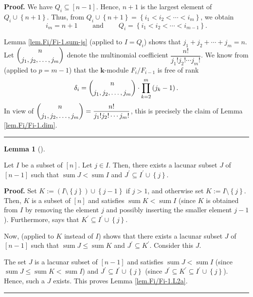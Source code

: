 \documentclass[numbers=enddot,12pt,final,onecolumn,notitlepage]{scrartcl}%
\theoremstyle{definition}
\newtheorem{lem}[theo]{Lemma}
\newenvironment{lemma}[1][]
{\begin{lem}[#1]\begin{leftbar}}
{\end{leftbar}\end{lem}}
\newenvironment{proof}[1][Proof]{\noindent\textbf{#1.} }{\ \rule{0.5em}{0.5em}}
\let\prodnonlimits\prod
\renewcommand{\prod}{\prodnonlimits\limits}
\begin{document}
\begin{proof}
We have $Q_{i}\subseteq\left[  n-1\right]  $. Hence, $n+1$ is the largest
element of $Q_{i}\cup\left\{  n+1\right\}  $. Thus, from $Q_{i}\cup\left\{
n+1\right\}  =\left\{  i_{1}<i_{2}<\cdots<i_{m}\right\}  $, we obtain
\[
i_{m}=n+1\ \ \ \ \ \ \ \ \ \ \text{and}\ \ \ \ \ \ \ \ \ \ Q_{i}=\left\{
i_{1}<i_{2}<\cdots<i_{m-1}\right\}  .
\]


Lemma \ref{lem.Fi/Fi-1.sum-js} (applied to $I=Q_{i}$) shows that $j_{1}%
+j_{2}+\cdots+j_{m}=n$. Let $\dbinom{n}{j_{1},j_{2},\ldots,j_{m}}$ denote the
multinomial coefficient $\dfrac{n!}{j_{1}!j_{2}!\cdots j_{m}!}$. We know from
\cite[Theorem 13.1 \textbf{(a)} and \textbf{(c)}]{s2b1} (applied to $p=m-1$)
that the $\mathbf{k}$-module $F_{i}/F_{i-1}$ is free of rank%
\[
\delta_{i}=\dbinom{n}{j_{1},j_{2},\ldots,j_{m}}\cdot\prod_{k=2}^{m}\left(
j_{k}-1\right)  .
\]
In view of $\dbinom{n}{j_{1},j_{2},\ldots,j_{m}}=\dfrac{n!}{j_{1}!j_{2}!\cdots
j_{m}!}$, this is precisely the claim of Lemma \ref{lem.Fi/Fi-1.dim}.
\end{proof}

\begin{lemma}
\label{lem.Fi/Fi-1.L2a}Let $I$ be a subset of $\left[  n\right]  $. Let $j\in
I$. Then, there exists a lacunar subset $J$ of $\left[  n-1\right]  $ such
that $\operatorname*{sum}J<\operatorname*{sum}I$ and $J^{\prime}\subseteq
I^{\prime}\cup\left\{  j\right\}  $.
\end{lemma}

\begin{proof}
Set $K:=\left(  I\setminus\left\{  j\right\}  \right)  \cup\left\{
j-1\right\}  $ if $j>1$, and otherwise set $K:=I\setminus\left\{  j\right\}
$. Then, $K$ is a subset of $\left[  n\right]  $ and satisfies
$\operatorname*{sum}K<\operatorname*{sum}I$ (since $K$ is obtained from $I$ by
removing the element $j$ and possibly inserting the smaller element $j-1$).
Furthermore, \cite[Proposition 8.6 \textbf{(a)}]{s2b1} says that $K^{\prime
}\subseteq I^{\prime}\cup\left\{  j\right\}  $.

Now, \cite[Corollary 8.8]{s2b1} (applied to $K$ instead of $I$) shows that
there exists a lacunar subset $J$ of $\left[  n-1\right]  $ such that
$\operatorname*{sum}J\leq\operatorname*{sum}K$ and $J^{\prime}\subseteq
K^{\prime}$. Consider this $J$.

The set $J$ is a lacunar subset of $\left[  n-1\right]  $ and satisfies
$\operatorname*{sum}J<\operatorname*{sum}I$ (since $\operatorname*{sum}%
J\leq\operatorname*{sum}K<\operatorname*{sum}I$) and $J^{\prime}\subseteq
I^{\prime}\cup\left\{  j\right\}  $ (since $J^{\prime}\subseteq K^{\prime
}\subseteq I^{\prime}\cup\left\{  j\right\}  $). Hence, such a $J$ exists.
This proves Lemma \ref{lem.Fi/Fi-1.L2a}.
\end{proof}
\end{document}
